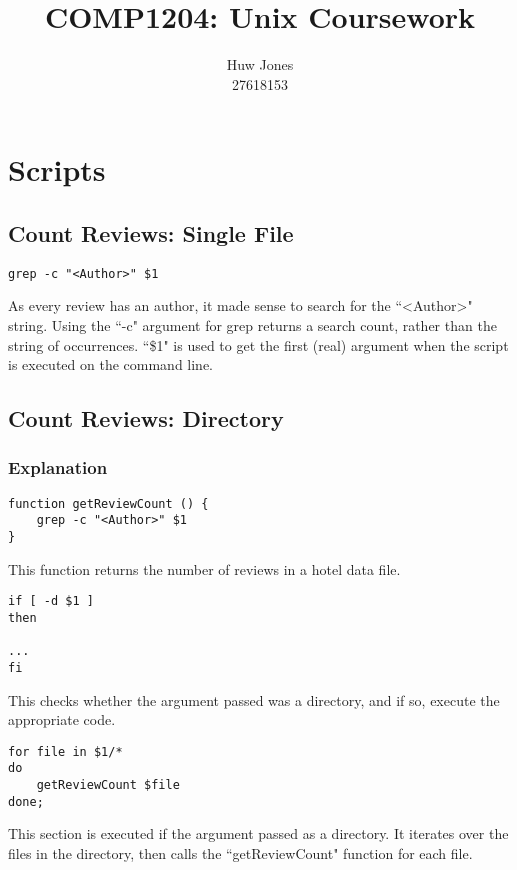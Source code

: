 \documentclass[a4paper]{article}
\author{Huw Jones \\27618153}
\title{COMP1204: Unix Coursework}
\begin{document}
\maketitle
\newpage

\section{Scripts}

%
\subsection{Count Reviews: Single File}

\begin{lstlisting}
grep -c "<Author>" $1
\end{lstlisting}
As every review has an author, it made sense to search for the ``\textless Author\textgreater" string.
Using the ``-c" argument for grep returns a search count, rather than the string of occurrences.
``\$1" is used to get the first (real) argument when the script is executed on the command line.

%
\subsection{Count Reviews: Directory}

\subsubsection{Explanation}

\begin{lstlisting}
function getReviewCount () {
	grep -c "<Author>" $1
}
\end{lstlisting}
This function returns the number of reviews in a hotel data file.

\begin{lstlisting}
if [ -d $1 ]
then

...
fi
\end{lstlisting}
This checks whether the argument passed was a directory, and if so, execute the appropriate code.

\begin{lstlisting}
for file in $1/*
do
	getReviewCount $file
done;
\end{lstlisting}
This section is executed if the argument passed as a directory.
It iterates over the files in the directory, then calls the ``getReviewCount" function for each file.
\end{document}

